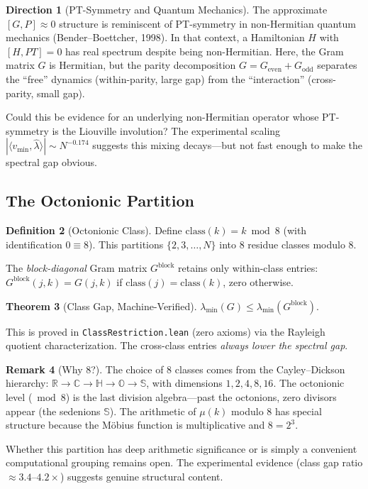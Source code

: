 \documentclass[11pt,a4paper]{article}
\theoremstyle{definition}
\newtheorem{definition}{Definition}[section]
\newtheorem{theorem}[definition]{Theorem}
\newtheorem{remark}[definition]{Remark}
\newtheorem{direction}[definition]{Direction}
\newcommand{\RR}{\mathbb{R}}
\newcommand{\CC}{\mathbb{C}}
\newcommand{\HH}{\mathbb{H}}
\newcommand{\OO}{\mathbb{O}}
\newcommand{\SSS}{\mathbb{S}}
\newcommand{\lean}[1]{\texttt{#1}}
\begin{document}
\begin{direction}[PT-Symmetry and Quantum Mechanics]
The approximate $[G, P] \approx 0$ structure is reminiscent of
PT-symmetry in non-Hermitian quantum mechanics (Bender--Boettcher, 1998).
In that context, a Hamiltonian $H$ with $[H, PT] = 0$ has real spectrum
despite being non-Hermitian. Here, the Gram matrix $G$ is Hermitian, but
the parity decomposition $G = G_{\mathrm{even}} + G_{\mathrm{odd}}$
separates the ``free'' dynamics (within-parity, large gap) from the
``interaction'' (cross-parity, small gap).

Could this be evidence for an underlying non-Hermitian operator whose
PT-symmetry is the Liouville involution? The experimental scaling
$|{\langle v_{\min}, \hat{\lambda}\rangle}| \sim N^{-0.174}$ suggests
this mixing decays---but not fast enough to make the spectral gap
obvious.
\end{direction}

\subsection{The Octonionic Partition}

\begin{definition}[Octonionic Class]
Define $\mathrm{class}(k) = k \bmod 8$ (with identification $0 \equiv 8$).
This partitions $\{2, 3, \ldots, N\}$ into 8 residue classes modulo 8.
\end{definition}

The \emph{block-diagonal} Gram matrix $G^{\mathrm{block}}$ retains only
within-class entries: $G^{\mathrm{block}}(j,k) = G(j,k)$ if
$\mathrm{class}(j) = \mathrm{class}(k)$, zero otherwise.

\begin{theorem}[Class Gap, Machine-Verified]
$\lambda_{\min}(G) \le \lambda_{\min}(G^{\mathrm{block}})$.
\end{theorem}

This is proved in \lean{ClassRestriction.lean} (zero axioms) via the
Rayleigh quotient characterization. The cross-class entries \emph{always
lower the spectral gap}.

\begin{remark}[Why 8?]
The choice of 8 classes comes from the Cayley--Dickson hierarchy:
$\RR \to \CC \to \HH \to \OO \to \SSS$, with dimensions $1, 2, 4, 8, 16$.
The octonionic level ($\bmod 8$) is the last division algebra---past the
octonions, zero divisors appear (the sedenions $\SSS$). The arithmetic
of $\mu(k)$ modulo 8 has special structure because the M\"obius function
is multiplicative and $8 = 2^3$.

Whether this partition has deep arithmetic significance or is simply a
convenient computational grouping remains open. The experimental
evidence (class gap ratio $\approx 3.4$--$4.2\times$) suggests
genuine structural content.
\end{remark}
\end{document}
